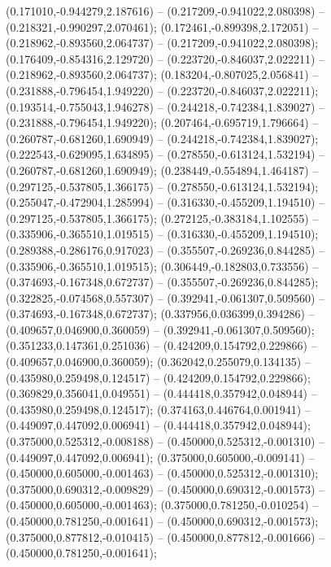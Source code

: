  (0.171010,-0.944279,2.187616) -- (0.217209,-0.941022,2.080398) -- (0.218321,-0.990297,2.070461);
 (0.172461,-0.899398,2.172051) -- (0.218962,-0.893560,2.064737) -- (0.217209,-0.941022,2.080398);
 (0.176409,-0.854316,2.129720) -- (0.223720,-0.846037,2.022211) -- (0.218962,-0.893560,2.064737);
 (0.183204,-0.807025,2.056841) -- (0.231888,-0.796454,1.949220) -- (0.223720,-0.846037,2.022211);
 (0.193514,-0.755043,1.946278) -- (0.244218,-0.742384,1.839027) -- (0.231888,-0.796454,1.949220);
 (0.207464,-0.695719,1.796664) -- (0.260787,-0.681260,1.690949) -- (0.244218,-0.742384,1.839027);
 (0.222543,-0.629095,1.634895) -- (0.278550,-0.613124,1.532194) -- (0.260787,-0.681260,1.690949);
 (0.238449,-0.554894,1.464187) -- (0.297125,-0.537805,1.366175) -- (0.278550,-0.613124,1.532194);
 (0.255047,-0.472904,1.285994) -- (0.316330,-0.455209,1.194510) -- (0.297125,-0.537805,1.366175);
 (0.272125,-0.383184,1.102555) -- (0.335906,-0.365510,1.019515) -- (0.316330,-0.455209,1.194510);
 (0.289388,-0.286176,0.917023) -- (0.355507,-0.269236,0.844285) -- (0.335906,-0.365510,1.019515);
 (0.306449,-0.182803,0.733556) -- (0.374693,-0.167348,0.672737) -- (0.355507,-0.269236,0.844285);
 (0.322825,-0.074568,0.557307) -- (0.392941,-0.061307,0.509560) -- (0.374693,-0.167348,0.672737);
 (0.337956,0.036399,0.394286) -- (0.409657,0.046900,0.360059) -- (0.392941,-0.061307,0.509560);
 (0.351233,0.147361,0.251036) -- (0.424209,0.154792,0.229866) -- (0.409657,0.046900,0.360059);
 (0.362042,0.255079,0.134135) -- (0.435980,0.259498,0.124517) -- (0.424209,0.154792,0.229866);
 (0.369829,0.356041,0.049551) -- (0.444418,0.357942,0.048944) -- (0.435980,0.259498,0.124517);
 (0.374163,0.446764,0.001941) -- (0.449097,0.447092,0.006941) -- (0.444418,0.357942,0.048944);
 (0.375000,0.525312,-0.008188) -- (0.450000,0.525312,-0.001310) -- (0.449097,0.447092,0.006941);
 (0.375000,0.605000,-0.009141) -- (0.450000,0.605000,-0.001463) -- (0.450000,0.525312,-0.001310);
 (0.375000,0.690312,-0.009829) -- (0.450000,0.690312,-0.001573) -- (0.450000,0.605000,-0.001463);
 (0.375000,0.781250,-0.010254) -- (0.450000,0.781250,-0.001641) -- (0.450000,0.690312,-0.001573);
 (0.375000,0.877812,-0.010415) -- (0.450000,0.877812,-0.001666) -- (0.450000,0.781250,-0.001641);
